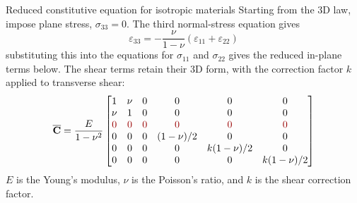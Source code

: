 \documentclass[aspectratio=169]{beamer}
\begin{document}
\begin{frame}{Reduced constitutive equation for isotropic materials}
  \small
  Starting from the 3D law, impose plane stress, $\sigma_{33}=0$. The third normal-stress equation gives
  $$\varepsilon_{33}=-\frac{\nu}{1-\nu}(\varepsilon_{11}+\varepsilon_{22})$$
  substituting this into the equations for $\sigma_{11}$ and $\sigma_{22}$ gives the reduced in-plane terms below. The shear terms retain their 3D form, with the correction factor $k$ applied to transverse shear:
  $$\overline{\mathbf C}=\frac{E}{1-\nu^2}
    \begin{bmatrix}
      1                  & \nu                & 0                  & 0                  & 0                  & 0                  \\
      \nu                & 1                  & 0                  & 0                  & 0                  & 0                  \\
      {\color{darkred}0} & {\color{darkred}0} & {\color{darkred}0} & {\color{darkred}0} & {\color{darkred}0} & {\color{darkred}0} \\
      0                  & 0                  & 0                  & (1-\nu)/2          & 0                  & 0                  \\
      0                  & 0                  & 0                  & 0                  & k(1-\nu)/2         & 0                  \\
      0                  & 0                  & 0                  & 0                  & 0                  & k(1-\nu)/2         \\
    \end{bmatrix}$$
  $E$ is the Young's modulus, $\nu$ is the Poisson's ratio, and $k$ is the shear correction factor.
\end{frame}
\end{document}
